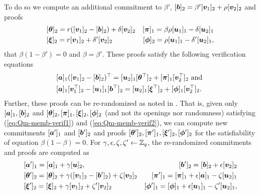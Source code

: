 To do so we compute an additional commitment to $\beta'$, $[{\boldsymbol{b}}]_2 = \beta'[{\boldsymbol{v}}_1]_2+\rho[{\boldsymbol{v}}_2]_2$ and proofs
\begin{align}
&[{\boldsymbol{\theta}}]_2 = r([{\boldsymbol{v}}_1]_2-[{\boldsymbol{b}}]_2)+\delta[{\boldsymbol{v}}_2]_2
&[{\boldsymbol{\pi}}]_1 = \beta\rho[{\boldsymbol{u}}_1]_1-\delta[{\boldsymbol{u}}_2]_1 \nonumber\\
&[{\boldsymbol{\xi}}]_2 = r[{\boldsymbol{v}}_1]_2+\delta'[{\boldsymbol{v}}_2]_2
&[{\boldsymbol{\phi}}]_2 = \rho[{\boldsymbol{u}}_1]_1 -\delta'[{\boldsymbol{u}}_2]_1,
\label{eq:Qm-memb-proofs}
\end{align}
that $\beta(1-\beta')=0$ and $\beta=\beta'$.
These proofs satisfy the following verification equations
\begin{align}
&[{\boldsymbol{a}}]_1([{\boldsymbol{v}}_1]_2-[{\boldsymbol{b}}]_2)^\top = [{\boldsymbol{u}}_2]_1[{\boldsymbol{\theta}}^\top]_2+[{\boldsymbol{\pi}}]_1[{\boldsymbol{v}}^\top_2]_2\text{ and } \label{eq:Qm-memb-verif1} \\
&[{\boldsymbol{a}}]_1[{\boldsymbol{v}}_1^\top]_2-[{\boldsymbol{u}}_1]_1[{\boldsymbol{b}}^\top]_2 = [{\boldsymbol{u}}_2]_1[{\boldsymbol{\xi}}^\top]_2 + [{\boldsymbol{\phi}}]_1[{\boldsymbol{v}}^\top_2]_2. \label{eq:Qm-memb-verif2}
\end{align}
Further, these proofs can be re-randomized as noted in \cite{C:BCCKLS09}. That is, given only $[{\boldsymbol{a}}]_1,[{\boldsymbol{b}}]_2$ and $[{\boldsymbol{\theta}}]_2,[{\boldsymbol{\pi}}]_1,[{\boldsymbol{\xi}}]_2,[{\boldsymbol{\phi}}]_2$ (and not its openings nor randomness) satisfying (\ref{eq:Qm-memb-verif1}) and (\ref{eq:Qm-memb-verif2}), we can compute new commitments $[{\boldsymbol{a}}']_1$ and $[{\boldsymbol{b}}']_2$ and proofs $[{\boldsymbol{\theta}}']_2,[{\boldsymbol{\pi}}']_1,[{\boldsymbol{\xi}}']_2,[{\boldsymbol{\phi}}']_2$ for the satisfiability of equation $\beta(1-\beta)=0$. For $\gamma,\epsilon,\zeta,\zeta'\gets\mathbb{Z}_q$, the re-randomized commitments and proofs are computed as
\begin{align}
&[{\boldsymbol{a}}']_1 = [{\boldsymbol{a}}]_1 + \gamma[{\boldsymbol{u}}]_2, &[{\boldsymbol{b}}']_2 = [{\boldsymbol{b}}]_2 + \epsilon[{\boldsymbol{v}}_2]_2 \nonumber\\
&[{\boldsymbol{\theta}}']_2 = [{\boldsymbol{\theta}}]_2 + \gamma([{\boldsymbol{v}}_1]_2-[{\boldsymbol{b}}']_2)+\zeta[{\boldsymbol{v}}_2]_2
&[{\boldsymbol{\pi}}']_1 = [{\boldsymbol{\pi}}]_1 + \epsilon[{\boldsymbol{a}}]_1-\zeta[{\boldsymbol{u}}_2]_1 \nonumber\\
&[{\boldsymbol{\xi}}']_2 = [{\boldsymbol{\xi}}]_2+\gamma[{\boldsymbol{v}}_1]_2+\zeta'[{\boldsymbol{v}}_2]_2
&[{\boldsymbol{\phi}}']_1 = [{\boldsymbol{\phi}}]_1 + \epsilon[{\boldsymbol{u}}_1]_1 -\zeta'[{\boldsymbol{u}}_2]_1,
\label{eq:Qm-rerand-proofs}
\end{align}

